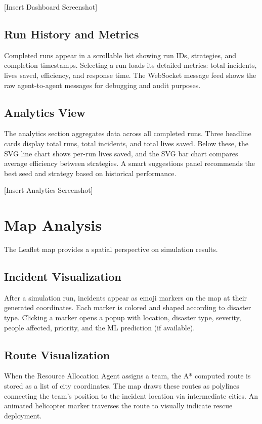 [Insert Dashboard Screenshot]

\subsection{Run History and Metrics}

Completed runs appear in a scrollable list showing run IDs, strategies, and completion timestamps. Selecting a run loads its detailed metrics: total incidents, lives saved, efficiency, and response time. The WebSocket message feed shows the raw agent-to-agent messages for debugging and audit purposes.

\subsection{Analytics View}

The analytics section aggregates data across all completed runs. Three headline cards display total runs, total incidents, and total lives saved. Below these, the SVG line chart shows per-run lives saved, and the SVG bar chart compares average efficiency between strategies. A smart suggestions panel recommends the best seed and strategy based on historical performance.

[Insert Analytics Screenshot]

\section{Map Analysis}
\label{sec:map_analysis}

The Leaflet map provides a spatial perspective on simulation results.

\subsection{Incident Visualization}

After a simulation run, incidents appear as emoji markers on the map at their generated coordinates. Each marker is colored and shaped according to disaster type. Clicking a marker opens a popup with location, disaster type, severity, people affected, priority, and the ML prediction (if available).

\subsection{Route Visualization}

When the Resource Allocation Agent assigns a team, the A* computed route is stored as a list of city coordinates. The map draws these routes as polylines connecting the team's position to the incident location via intermediate cities. An animated helicopter marker traverses the route to visually indicate rescue deployment.

